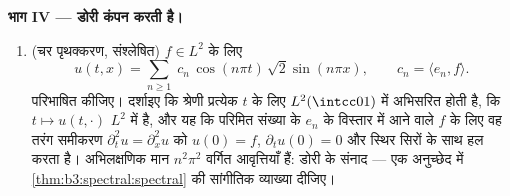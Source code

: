 \begin{problem}[{सप्ताहांत समस्या --- ग्रीन संकारक, ज्या आधार,
और एक अनुरेख सूत्र}]
\medskip
\noindent\textbf{भाग IV --- डोरी कंपन करती है।}
\begin{enumerate}[resume]
  \item (चर पृथक्करण, संश्लेषित) $f \in
        L^2$ के लिए
        \[
        u(t, x) = \sum_{n\geq1}\;c_n\,
        \cos(n\pi t)\,\sqrt2\sin(n\pi x),
        \qquad c_n = \langle e_n, f\rangle .
        \]
        परिभाषित कीजिए। दर्शाइए कि श्रेणी प्रत्येक $t$ के लिए
        $L^2(\intcc01)$ में अभिसरित होती है, कि $t\mapsto u(t, \cdot)$ $L^2$ में  है, और
        यह कि परिमित संख्या के $e_n$ के विस्तार में आने वाले
        $f$ के लिए वह तरंग समीकरण $\partial_t^2u =
        \partial_x^2u$ को $u(0) = f$, $\partial_tu(0) = 0$ और
        स्थिर सिरों के साथ हल करता है। अभिलक्षणिक मान $n^2\pi^2$
        वर्गित आवृत्तियाँ हैं: डोरी के संनाद --- एक अनुच्छेद में
        \cref{thm:b3:spectral:spectral} की सांगीतिक व्याख्या दीजिए।
\end{enumerate}


\end{problem}
